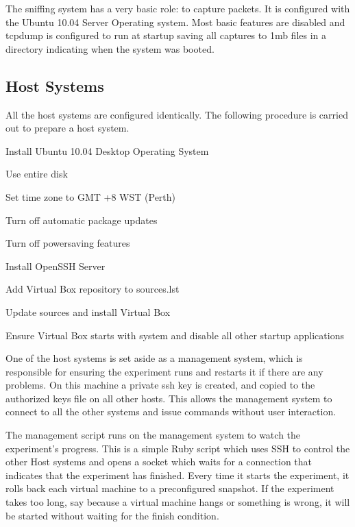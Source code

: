 The sniffing system has a very basic role: to capture packets. It is configured with the Ubuntu 10.04 Server Operating system. Most basic features are disabled and tcpdump is configured to run at startup saving all captures to 1mb files in a directory indicating when the system was booted.

\subsection{Host Systems}

All the host systems are configured identically. The following procedure is carried out to prepare a host system.

\begin{itemize*}
  \item Install Ubuntu 10.04 Desktop Operating System
    \begin{itemize*}
      \item Use entire disk
      \item Set time zone to GMT +8 WST (Perth)
    \end{itemize*}
  \item Turn off automatic package updates
  \item Turn off powersaving features
  \item Install OpenSSH Server
  \item Add Virtual Box repository to sources.lst
  \item Update sources and install Virtual Box
  \item Ensure Virtual Box starts with system and disable all other startup applications
\end{itemize*}

One of the host systems is set aside as a management system, which is responsible for ensuring the experiment runs and restarts it if there are any problems. On this machine a private ssh key is created, and copied to the authorized keys file on all other hosts. This allows the management system to connect to all the other systems and issue commands without user interaction.

The management script runs on the management system to watch the experiment's progress. This is a simple Ruby script which uses SSH to control the other Host systems and opens a socket which waits for a connection that indicates that the experiment has finished. Every time it starts the experiment, it rolls back each virtual machine to a preconfigured snapshot. If the experiment takes too long, say because a virtual machine hangs or something is wrong, it will be started without waiting for the finish condition.

